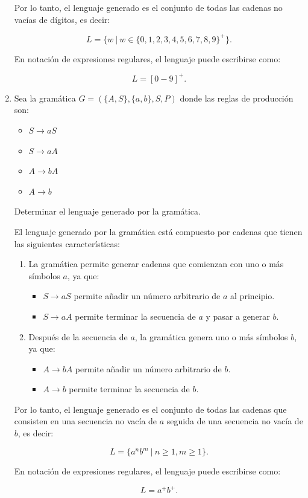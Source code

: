 \documentclass[12pt]{report} %
\begin{document}
\begin{enumerate}
\begin{solucion}[Ejercicio 2.b]
   Por lo tanto, el lenguaje generado es el conjunto de todas las cadenas no vacías de dígitos, es decir:

   $$
   L = \{ w \ | \ w \in \{0, 1, 2, 3, 4, 5, 6, 7, 8, 9\}^+ \}.
   $$

   En notación de expresiones regulares, el lenguaje puede escribirse como:

   $$
   L = [0-9]^+.
   $$

   \end{solucion}
\item
  Sea la gramática \(G = (\{A, S\}, \{a, b\}, S, P)\) donde las reglas
  de producción son:\\

  \begin{itemize}
       \item $S \to aS$
       \item $S \to aA$
       \item $A \to bA$
       \item $A \to b$
   \end{itemize}

  Determinar el lenguaje generado por la gramática.

  \begin{solucion}[Ejercicio 2.c]

   El lenguaje generado por la gramática está compuesto por cadenas que tienen las siguientes características:

   \begin{enumerate}
       \item La gramática permite generar cadenas que comienzan con uno o más símbolos $a$, ya que:
           \begin{itemize}
               \item $S \to aS$ permite añadir un número arbitrario de $a$ al principio.
               \item $S \to aA$ permite terminar la secuencia de $a$ y pasar a generar $b$.
           \end{itemize}
       \item Después de la secuencia de $a$, la gramática genera uno o más símbolos $b$, ya que:
           \begin{itemize}
               \item $A \to bA$ permite añadir un número arbitrario de $b$.
               \item $A \to b$ permite terminar la secuencia de $b$.
           \end{itemize}
   \end{enumerate}

   Por lo tanto, el lenguaje generado es el conjunto de todas las cadenas que consisten en una secuencia no vacía de $a$ seguida de una secuencia no vacía de $b$, es decir:

   $$
   L = \{ a^n b^m \ | \ n \geq 1, m \geq 1 \}.
   $$

   En notación de expresiones regulares, el lenguaje puede escribirse como:

   $$
   L = a^+b^+.
   $$

   \end{solucion}
\end{enumerate}
\end{document}
